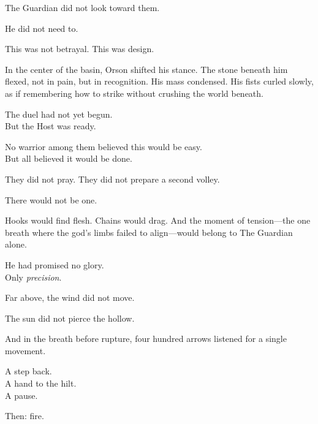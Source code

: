 \documentclass[12pt]{article}
\begin{document}
\vspace{0.5em}
The Guardian did not look toward them.

\vspace{0.5em}
He did not need to.

\vspace{0.5em}
This was not betrayal. This was design.

\vspace{0.5em}
In the center of the basin, Orson shifted his stance. The stone beneath him flexed, not in pain, but in recognition. His mass condensed. His fists curled slowly, as if remembering how to strike without crushing the world beneath.

\vspace{0.5em}
The duel had not yet begun.\\
But the Host was ready.

\vspace{0.5em}
No warrior among them believed this would be easy.\\
But all believed it would be done.

\vspace{0.5em}
They did not pray. They did not prepare a second volley.

\vspace{0.5em}
There would not be one.

\vspace{0.5em}
Hooks would find flesh. Chains would drag. And the moment of tension---the one breath where the god’s limbs failed to align---would belong to The Guardian alone.

\vspace{0.5em}
He had promised no glory.\\
Only \textit{precision}.

\vspace{0.5em}
Far above, the wind did not move.

\vspace{0.5em}
The sun did not pierce the hollow.

\vspace{0.5em}
And in the breath before rupture, four hundred arrows listened for a single movement.

\vspace{0.5em}
A step back.\\
A hand to the hilt.\\
A pause.

\vspace{0.5em}
Then: fire.
\end{document}
